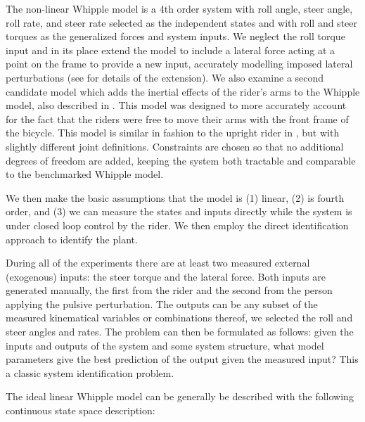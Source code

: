 \documentclass[a4paper]{article}
\begin{document}
The non-linear Whipple model is a 4th order system with roll angle, steer
angle, roll rate, and steer rate selected as the independent states and with
roll and steer torques as the generalized forces and system inputs. We neglect
the roll torque input and in its place extend the model to include a lateral
force acting at a point on the frame to provide a new input, accurately
modelling imposed lateral perturbations (see \cite{Moore2012} for details of
the extension). We also examine a second candidate model which adds the
inertial effects of the rider's arms to the Whipple model, also described in
\cite{Moore2012}. This model was designed to more accurately account for the
fact that the riders were free to move their arms with the front frame of the
bicycle. This model is similar in fashion to the upright rider in
\cite{Schwab2010a}, but with slightly different joint definitions. Constraints
are chosen so that no additional degrees of freedom are added, keeping the
system both tractable and comparable to the benchmarked Whipple model.

We then make the basic assumptions that the model is (1) linear, (2) is fourth
order, and (3) we can measure the states and inputs directly while the system
is under closed loop control by the rider. We then employ the direct
identification approach to identify the plant.

During all of the experiments there are at least two measured external
(exogenous) inputs: the steer torque and the lateral force. Both inputs are
generated manually, the first from the rider and the second from the person
applying the pulsive perturbation. The outputs can be any subset of the
measured kinematical variables or combinations thereof, we selected the roll
and steer angles and rates. The problem can then be formulated as follows:
given the inputs and outputs of the system and some system structure, what
model parameters give the best prediction of the output given the measured
input? This a classic system identification problem.

The ideal linear Whipple model can be generally be described with the following
continuous state space description:
\end{document}
